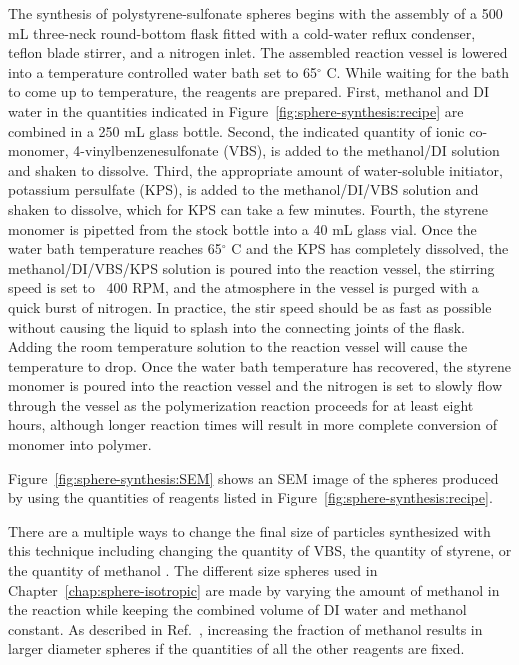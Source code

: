 The synthesis of polystyrene-sulfonate spheres begins with the assembly of a 500 mL three-neck round-bottom flask fitted with a cold-water reflux condenser, teflon blade stirrer, and a nitrogen inlet. 
The assembled reaction vessel is lowered into a temperature controlled water bath set to 65$^\circ$ C.
While waiting for the bath to come up to temperature, the reagents are prepared.
First, methanol and DI water in the quantities indicated in Figure~\ref{fig:sphere-synthesis:recipe} are combined in a 250 mL glass bottle.
Second, the indicated quantity of ionic co-monomer, 4-vinylbenzenesulfonate (VBS), is added to the methanol/DI solution and shaken to dissolve.
Third, the appropriate amount of water-soluble initiator, potassium persulfate (KPS), is added to the methanol/DI/VBS solution and shaken to dissolve, which for KPS can take a few minutes.
Fourth, the styrene monomer is pipetted from the stock bottle into a 40 mL glass vial.
Once the water bath temperature reaches 65$^\circ$ C and the KPS has completely dissolved, the methanol/DI/VBS/KPS solution is poured into the reaction vessel, the stirring speed is set to ~400 RPM, and the atmosphere in the vessel is purged with a quick burst of nitrogen.
In practice, the stir speed should be as fast as possible without causing the liquid to splash into the connecting joints of the flask.
Adding the room temperature solution to the reaction vessel will cause the temperature to  drop.
Once the water bath temperature has recovered, the styrene monomer is poured into the reaction vessel and the nitrogen is set to slowly flow through the vessel as the polymerization reaction proceeds for at least eight hours, although longer reaction times will result in more complete conversion of monomer into polymer.

Figure~\ref{fig:sphere-synthesis:SEM} shows an SEM image of the spheres produced by using the quantities of reagents listed in Figure~\ref{fig:sphere-synthesis:recipe}.

There are a multiple ways to change the final size of particles synthesized with this technique including changing the quantity of VBS, the quantity of styrene, or the quantity of methanol \cite{CHONDE:1981p1047}.
The different size spheres used in Chapter~\ref{chap:sphere-isotropic} are made by varying the amount of methanol in the reaction while keeping the combined volume of DI water and methanol constant.
As described in Ref.~\cite{CHONDE:1981p1047}, increasing the fraction of methanol results in larger diameter spheres if the quantities of all the other reagents are fixed.

